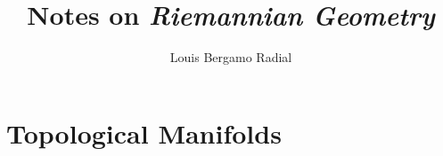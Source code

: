 \documentclass[12pt,oneside,a4paper]{book}
\title{Notes on \textit{Riemannian Geometry}}
\author{Louis Bergamo Radial}
\numberwithin{equation}{section}
\begin{document}
\maketitle

\tableofcontents

\chapter{Topological Manifolds}



\printbibliography
\end{document}
